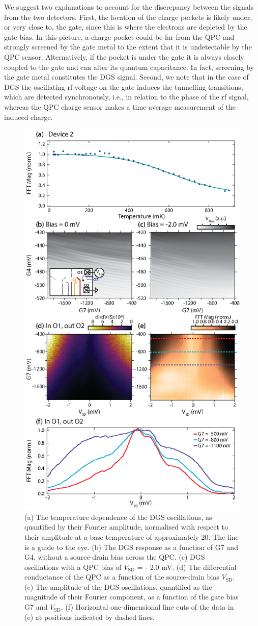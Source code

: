 We suggest two explanations to account for the discrepancy between the signals from the two detectors. First, the location of the charge pockets is likely under, or very close to, the gate, since this is where the electrons are depleted by the gate bias. In this picture, a charge pocket could be far from the QPC and strongly screened by the gate metal to the extent that it is undetectable by the QPC sensor. Alternatively, if the pocket is under the gate it is always closely coupled to the gate and can alter its quantum capacitance. In fact, screening by the gate metal constitutes the DGS signal. Second, we note that in the case of DGS the oscillating rf voltage on the gate induces the tunnelling transitions, which are detected synchronously, i.e., in relation to the phase of the rf signal, whereas the QPC charge sensor makes a time-average measurement of the induced charge.

\begin{figure}
  \includegraphics[width=0.65\linewidth]{figure5}
  \caption[The effect of bias and heating on the visibility of the anomalous signals]{\label{fig:pock_fig5} (a) The temperature dependence of the DGS oscillations, as quantified by their Fourier amplitude, normalised with respect to their amplitude at a base temperature of approximately \SI{20}{\mk}. The line is a guide to the eye. (b) The DGS response as a function of G7 and G4, without a source-drain bias across the QPC. (c) DGS oscillations with a QPC bias of $V_{\textrm{SD}}$ = - 2.0 mV. (d) The differential conductance of the QPC as a function of the source-drain bias $V_{\textrm{SD}}$. (e) The amplitude of the DGS oscillations, quantified as the magnitude of their Fourier component, as a function of the gate bias G7 and $V_{\textrm{SD}}$. (f) Horizontal one-dimensional line cuts of the data in (e) at positions indicated by dashed lines.}
\end{figure}

